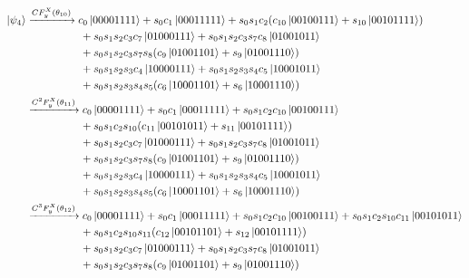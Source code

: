 \documentclass[11pt, oneside]{article}   	%
\begin{document}
\begin{align*}
\ket{\psi_4}
&\xrightarrow{CF^X_y(\theta_{10})} 
c_0 \ket{00001111} 
+ s_0 c_1 \ket{00011111}
+ s_0 s_1 c_2 (c_{10} \ket{00100111} + s_{10} \ket{00101111}) \\
& \hspace{5em} 
+ s_0 s_1 s_2 c_3 c_7 \ket{01000111}
+ s_0 s_1 s_2 c_3 s_7 c_8 \ket{01001011} \\
& \hspace{5em} 
+ s_0 s_1 s_2 c_3 s_7 s_8 (c_9 \ket{01001101} + s_9 \ket{01001110}) \\
& \hspace{5em} 
+ s_0 s_1 s_2 s_3 c_4 \ket{10000111}
+ s_0 s_1 s_2 s_3 s_4 c_5 \ket{10001011} \\
& \hspace{5em} 
+ s_0 s_1 s_2 s_3 s_4 s_5 (c_6 \ket{10001101} + s_6 \ket{10001110} ) \\
&\xrightarrow{C^2 F^X_y(\theta_{11})} 
c_0 \ket{00001111} 
+ s_0 c_1 \ket{00011111}
+ s_0 s_1 c_2 c_{10} \ket{00100111} \\
& \hspace{5em} 
+ s_0 s_1 c_2 s_{10} (c_{11} \ket{00101011} + s_{11} \ket{00101111}) \\
& \hspace{5em} 
+ s_0 s_1 s_2 c_3 c_7 \ket{01000111}
+ s_0 s_1 s_2 c_3 s_7 c_8 \ket{01001011} \\
& \hspace{5em} 
+ s_0 s_1 s_2 c_3 s_7 s_8 (c_9 \ket{01001101} + s_9 \ket{01001110}) \\
& \hspace{5em} 
+ s_0 s_1 s_2 s_3 c_4 \ket{10000111}
+ s_0 s_1 s_2 s_3 s_4 c_5 \ket{10001011} \\
& \hspace{5em} 
+ s_0 s_1 s_2 s_3 s_4 s_5 (c_6 \ket{10001101} + s_6 \ket{10001110} ) \\
&\xrightarrow{C^3 F^X_y(\theta_{12})} 
c_0 \ket{00001111} 
+ s_0 c_1 \ket{00011111}
+ s_0 s_1 c_2 c_{10} \ket{00100111}
+ s_0 s_1 c_2 s_{10} c_{11} \ket{00101011} \\
& \hspace{5em} 
+ s_0 s_1 c_2 s_{10} s_{11} (c_{12} \ket{00101101} + s_{12} \ket{00101111}) \\
& \hspace{5em} 
+ s_0 s_1 s_2 c_3 c_7 \ket{01000111}
+ s_0 s_1 s_2 c_3 s_7 c_8 \ket{01001011} \\
& \hspace{5em} 
+ s_0 s_1 s_2 c_3 s_7 s_8 (c_9 \ket{01001101} + s_9 \ket{01001110}) \\

\end{align*}
\end{document}
